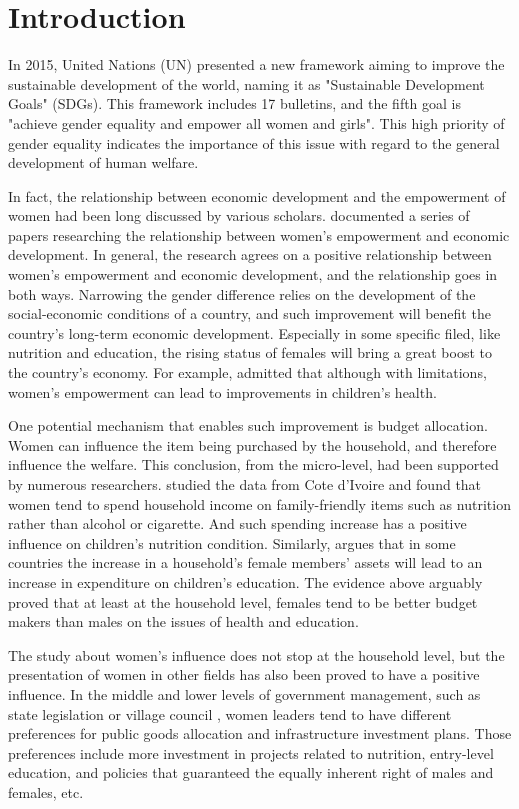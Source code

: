 \section{Introduction}
In 2015, United Nations (UN) presented a new framework aiming to improve the sustainable development of the world, naming it as "Sustainable Development Goals" (SDGs).
This framework includes 17 bulletins, and the fifth goal is "achieve gender equality and empower all women and girls".
This high priority of gender equality indicates the importance of this issue with regard to the general development of human welfare.

In fact, the relationship between economic development and the empowerment of women had been long discussed by various scholars.
 documented a series of papers researching the relationship between women's empowerment and economic development.
In general, the research agrees on a positive relationship between women's empowerment and economic development, and the relationship goes in both ways.
Narrowing the gender difference relies on the development of the social-economic conditions of a country, and such improvement will benefit the country's long-term economic development.
Especially in some specific filed, like nutrition and education, the rising status of females will bring a great boost to the country's economy.
For example, \citeauthor{Duflo2012} admitted that although with limitations, women's empowerment can lead to improvements in children's health.

One potential mechanism that enables such improvement is budget allocation.
Women can influence the item being purchased by the household, and therefore influence the welfare.
This conclusion, from the micro-level, had been supported by numerous researchers.
 studied the data from Cote d'Ivoire and found that women tend to spend household income on family-friendly items such as nutrition rather than alcohol or cigarette.
And such spending increase has a positive influence on children's nutrition condition.
Similarly,  argues that in some countries the increase in a household's female members' assets will lead to an increase in expenditure on children's education. 
The evidence above arguably proved that at least at the household level, females tend to be better budget makers than males on the issues of health and education.

The study about women's influence does not stop at the household level, but the presentation of women in other fields has also been proved to have a positive influence.
In the middle and lower levels of government management, such as state legislation \cite{Irma2011} or village council \cite{Chattopadhyay2004}, women leaders tend to have different preferences for public goods allocation and infrastructure investment plans.
Those preferences include more investment in projects related to nutrition, entry-level education, and policies that guaranteed the equally inherent right of males and females, etc.


